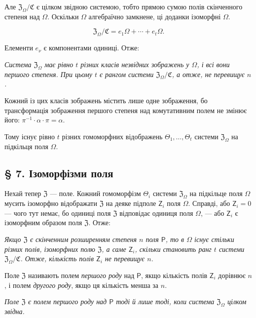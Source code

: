 \documentclass[11pt]{article}
\begin{document}
Але \(\mathfrak Z_\Omega/\mathfrak C\) є цілком звідною системою, тобто прямою сумою полів скінченного степеня над \(\Omega\). Оскільки \(\Omega\) алгебраїчно замкнене, ці доданки ізоморфні \(\Omega\).

\[
\mathfrak Z_\Omega/\mathfrak C=e_1\Omega+\cdots+e_t\Omega.
\]

Елементи \(e_\nu\) є компонентами одиниці. Отже:

\emph{Система \(\mathfrak Z_\Omega\) має рівно \(t\) різних класів незвідних зображень у \(\Omega\), і всі вони першого степеня. При цьому \(t\) є рангом системи \(\mathfrak Z_\Omega/\mathfrak C\), а отже, не перевищує \(n\).}

Кожний із цих класів зображень містить лише одне зображення, бо трансформація зображення першого степеня над комутативним полем не змінює його: \(\pi^{-1}\cdot\alpha\cdot\pi=\alpha\).

Тому існує рівно \(t\) різних гомоморфних відображень \(\Theta_1,\ldots,\Theta_t\) системи \(\mathfrak Z_\Omega\) на підкільця поля \(\Omega\).

\subsection*{§ 7. Ізоморфізми поля}\label{die-isomorphismen-eines-koerpers}

Нехай тепер \(\mathfrak Z\) --- поле. Кожний гомоморфізм \(\Theta_i\) системи \(\mathfrak Z_\Omega\) на підкільце поля \(\Omega\) мусить ізоморфно відображати \(\mathfrak Z\) на деяке підполе \(\mathsf{Z}_i\) поля \(\Omega\). Справді, або \(\mathsf{Z}_i=0\) --- чого тут немає, бо одиниці поля \(\mathfrak Z\) відповідає одиниця поля \(\Omega\), --- або \(\mathsf{Z}_i\) є ізоморфним образом поля \(\mathfrak Z\). Отже:

\emph{Якщо \(\mathfrak Z\) є скінченним розширенням степеня \(n\) поля \(\mathsf P\), то в \(\Omega\) існує стільки різних полів, ізоморфних полю \(\mathfrak Z\), а саме \(\mathsf{Z}_i\), скільки становить ранг \(t\) системи \(\mathfrak Z_\Omega/\mathfrak C\). Отже, кількість полів \(\mathsf{Z}_i\) не перевищує \(n\).}

Поле \(\mathfrak Z\) називають полем \emph{першого роду} над \(\mathsf P\), якщо кількість полів \(\mathsf{Z}_i\) дорівнює \(n\), і полем \emph{другого роду}, якщо ця кількість менша за \(n\).

\emph{Поле \(\mathfrak Z\) є полем першого роду над \(\mathsf P\) тоді й лише тоді, коли система \(\mathfrak Z_\Omega\) цілком звідна.}
\end{document}
